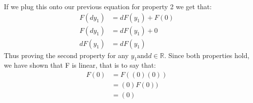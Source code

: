 \documentclass[11pt]{article}
\begin{document}
If we plug this onto our previous equation for property 2 we get that:
\begin{align*}
F(dy_1) &= dF(y_1) + F(0)\\
F(dy_1) &= dF(y_1) + 0\\
dF(y_1) &= dF(y_1)
\end{align*}
Thus proving the second property for any $y_1 \text{and} d \in \mathbb{R}$. Since both properties hold, we have shown that F is linear, that is to say that:
\begin{align*}
F(0) &= F((0)(0))\\
       &= (0)F(0))\\
       &= (0)
\end{align*}
\\\\
\end{document}

